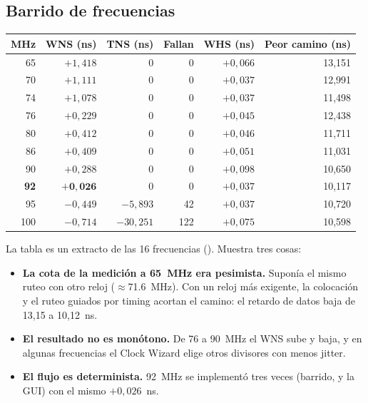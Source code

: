 \subsection{Barrido de frecuencias}

\begin{center}
\small
\begin{tabular}{@{}r r r r r r@{}}
  \toprule
  \textbf{MHz} & \textbf{WNS (ns)} & \textbf{TNS (ns)} & \textbf{Fallan} & \textbf{WHS (ns)} & \textbf{Peor camino (ns)} \\
  \midrule
  65  & $+1{,}418$ & 0 & 0 & $+0{,}066$ & 13,151 \\
  70  & $+1{,}111$ & 0 & 0 & $+0{,}037$ & 12,991 \\
  74  & $+1{,}078$ & 0 & 0 & $+0{,}037$ & 11,498 \\
  76  & $+0{,}229$ & 0 & 0 & $+0{,}045$ & 12,438 \\
  80  & $+0{,}412$ & 0 & 0 & $+0{,}046$ & 11,711 \\
  86  & $+0{,}409$ & 0 & 0 & $+0{,}051$ & 11,031 \\
  90  & $+0{,}288$ & 0 & 0 & $+0{,}098$ & 10,650 \\
  \textbf{92} & $\mathbf{+0{,}026}$ & 0 & 0 & $+0{,}037$ & 10,117 \\
  95  & $-0{,}449$ & $-5{,}893$ & 42 & $+0{,}037$ & 10,720 \\
  100 & $-0{,}714$ & $-30{,}251$ & 122 & $+0{,}075$ & 10,598 \\
  \bottomrule
\end{tabular}
\end{center}

La tabla es un extracto de las 16 frecuencias (). Muestra
tres cosas:

\begin{itemize}[nosep]
  \item \textbf{La cota de la medición a \qty{65}{\mega\hertz} era pesimista.} Suponía el mismo
        ruteo con otro reloj ($\approx$\qty{71,6}{\mega\hertz}). Con un reloj más exigente, la
        colocación y el ruteo guiados por timing acortan el camino: el retardo de datos baja de
        13,15 a 10,12~ns.
  \item \textbf{El resultado no es monótono.} De 76 a \qty{90}{\mega\hertz} el WNS sube y baja,
        y en algunas frecuencias el Clock Wizard elige otros divisores con menos jitter.
  \item \textbf{El flujo es determinista.} \qty{92}{\mega\hertz} se implementó tres veces (barrido,
         y la GUI) con el mismo $+0{,}026$~ns.
\end{itemize}

